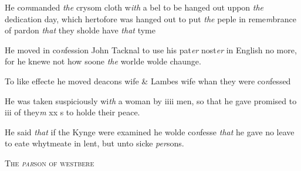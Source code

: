 \documentclass[12pt, a4paper]{book}
\begin{document}
				\marginpar[\vspace{0.5cm}{\textcolor{Gray}{crysom cloth 3}}]{}
			
		\ifthenelse{\isodd{\thepage}}
		{\reversemarginpar}
		{\normalmarginpar}
		He co\textit{m}manded \textit{the} crysom cloth w\textit{ith} a bel to be hanged out
 uppon \textit{the} dedication day, which hertofore was hanged
 out to put \textit{the} peple in reme\textit{m}brance of pardon \textit{that} they
 sholde have \textit{that} tyme
            	
			
				\marginpar[\vspace{0.5cm}{\textcolor{Gray}{4}}]{}
			
		\ifthenelse{\isodd{\thepage}}
		{\reversemarginpar}
		{\normalmarginpar}
		He moved in co\textit{n}fession John Tacknal to use his pat\textit{er} nost\textit{er}
 in English no more, for he knewe not how soone \textit{the}
 worlde wolde chaunge.
 

				\marginpar[\vspace{0.5cm}{\textcolor{Gray}{5}}]{}
			
		\ifthenelse{\isodd{\thepage}}
		{\reversemarginpar}
		{\normalmarginpar}
		To like effecte he moved deacons wife \& Lambes wife
 whan they were co\textit{n}fessed
            	
				\marginpar[\vspace{0.5cm}{\textcolor{Gray}{Incontynencie 6}}]{}
			
		\ifthenelse{\isodd{\thepage}}
		{\reversemarginpar}
		{\normalmarginpar}
		He was taken suspiciously wi\textit{th} a woman by iiii men,
            		so that he gave promised to iii of they\textit{m} xx s to holde their peace.
            	 
				\marginpar[\vspace{0.5cm}{\textcolor{Gray}{lent}}]{}
			 
				\marginpar[\vspace{0.5cm}{\textcolor{Gray}{7}}]{}
			
		\ifthenelse{\isodd{\thepage}}
		{\reversemarginpar}
		{\normalmarginpar}
		He said \textit{that} if the Kynge were examined he wolde co\textit{n}fesse
 \textit{that} he gave no leave to eate whytmeate in lent, but
 unto sicke \textit{per}sons.
 

            
            	
				\begin{center} \begin{large} {\scshape The \textit{par}son of westbere} \end{large} \end{center}
			
\end{document}
